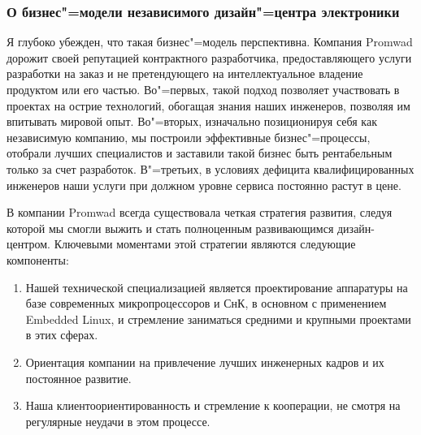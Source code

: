 \documentclass[10pt, a5paper]{article}
\begin{document}



\subsubsection*{О бизнес"=модели независимого дизайн"=центра электроники}
Я глубоко убежден, что такая бизнес"=модель перспективна. Компания Promwad дорожит своей репутацией контрактного разработчика, предоставляющего услуги разработки на заказ и не претендующего на интеллектуальное владение продуктом или его частью. 
Во"=первых, такой подход позволяет участвовать в проектах на острие технологий, обогащая знания наших инженеров, позволяя им впитывать мировой опыт. Во"=вторых, изначально позиционируя себя как независимую компанию, мы построили эффективные бизнес"=процессы, отобрали лучших специалистов и заставили такой бизнес быть рентабельным только за счет разработок. В"=третьих, в условиях дефицита квалифицированных инженеров наши услуги при должном уровне сервиса постоянно растут в цене.

В компании Promwad всегда существовала четкая стратегия развития, следуя которой мы смогли выжить и стать полноценным развивающимся дизайн-центром. Ключевыми моментами этой стратегии являются следующие компоненты:
\begin{enumerate}
\item Нашей технической специализацией является проектирование аппаратуры на базе современных микропроцессоров и СнК, в основном с применением Embedded Linux, и стремление заниматься средними и крупными проектами в этих сферах.
\item Ориентация компании на привлечение лучших инженерных кадров и их постоянное развитие.
\item Наша клиентоориентированность и стремление к кооперации, не смотря на регулярные неудачи в этом процессе.
\end{enumerate}
\end{document}
